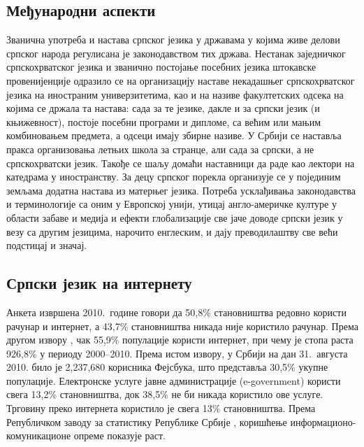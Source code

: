 \begin{multicols}{2}
 \subsection {Међународни аспекти}
   
 
Званична употреба и настава српског језика у државама у којима живе делови српског народа регулисана је законодавством тих држава. 
Нестанак заједничког српскохрватског језика и званично постојање посебних језика штокавске провенијенције одразило се на организацију наставе некадашњег српскохрватског језика на иностраним универзитетима, као и на називе факултетских одсека на којима се држала та настава: сада за те језике, дакле и за српски језик (и књижевност), постоје посебни програми и дипломе, са већим или мањим комбиновањем предмета, а одсеци имају збирне називе.
У Србији се наставља пракса организовања летњих  школа за странце, али сада за српски, а не српскохрватски језик. Такође се шаљу домаћи наставници да раде као лектори на катедрама у иностранству. 
За децу српског порекла организује се у појединим земљама додатна настава из матерњег језика. 
Потреба усклађивања законодавства и терминологије са оним у Европској унији, утицај англо-америчке културе у области забаве и медија и ефекти глобализације све јаче доводе српски језик у везу са другим језицима, нарочито енглеским, и дају преводилаштву све већи  подстицај и значај.

 \subsection {Српски језик на интернету}
   
Анкета \cite{PKEY204} извршена 2010.~године говори да 50,8\% становништва редовно користи рачунар и интернет, а 43,7\% становништва никада није користило рачунар. Према другом извору \cite{EUROPA2}, чак 55,9\% популације користи интернет, при чему је стопа раста 926,8\% у периоду 2000--2010. Према истом извору, у Србији на дан 31.~августа 2010. било је 2,237,680 корисника Фејсбука, што представља 30,5\% укупне популације. Електронске услуге јавне администрације (e-government) користи  свега 13,2\% становништва, док 38,5\% не би никада користило ове услуге. Трговину преко интернета користило је свега 13\% становништва. Према Републичком заводу за статистику Републике Србије \cite{WEBRZS}, коришћење информационо-комуникационе опреме показује раст.


\end{multicols}
